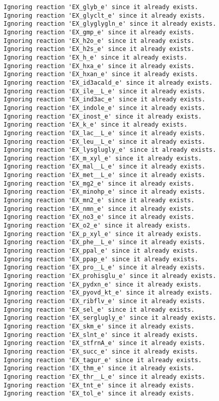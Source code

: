 \documentclass[
  letterpaper,
  DIV=11,
  numbers=noendperiod]{scrartcl}
\begin{document}
\begin{verbatim}
Ignoring reaction 'EX_glyb_e' since it already exists.
Ignoring reaction 'EX_glyclt_e' since it already exists.
Ignoring reaction 'EX_glyglygln_e' since it already exists.
Ignoring reaction 'EX_gmp_e' since it already exists.
Ignoring reaction 'EX_h2o_e' since it already exists.
Ignoring reaction 'EX_h2s_e' since it already exists.
Ignoring reaction 'EX_h_e' since it already exists.
Ignoring reaction 'EX_hxa_e' since it already exists.
Ignoring reaction 'EX_hxan_e' since it already exists.
Ignoring reaction 'EX_id3acald_e' since it already exists.
Ignoring reaction 'EX_ile__L_e' since it already exists.
Ignoring reaction 'EX_ind3ac_e' since it already exists.
Ignoring reaction 'EX_indole_e' since it already exists.
Ignoring reaction 'EX_inost_e' since it already exists.
Ignoring reaction 'EX_k_e' since it already exists.
Ignoring reaction 'EX_lac__L_e' since it already exists.
Ignoring reaction 'EX_leu__L_e' since it already exists.
Ignoring reaction 'EX_lysglugly_e' since it already exists.
Ignoring reaction 'EX_m_xyl_e' since it already exists.
Ignoring reaction 'EX_mal__L_e' since it already exists.
Ignoring reaction 'EX_met__L_e' since it already exists.
Ignoring reaction 'EX_mg2_e' since it already exists.
Ignoring reaction 'EX_minohp_e' since it already exists.
Ignoring reaction 'EX_mn2_e' since it already exists.
Ignoring reaction 'EX_nmn_e' since it already exists.
Ignoring reaction 'EX_no3_e' since it already exists.
Ignoring reaction 'EX_o2_e' since it already exists.
Ignoring reaction 'EX_p_xyl_e' since it already exists.
Ignoring reaction 'EX_phe__L_e' since it already exists.
Ignoring reaction 'EX_ppal_e' since it already exists.
Ignoring reaction 'EX_ppap_e' since it already exists.
Ignoring reaction 'EX_pro__L_e' since it already exists.
Ignoring reaction 'EX_prohisglu_e' since it already exists.
Ignoring reaction 'EX_pydxn_e' since it already exists.
Ignoring reaction 'EX_pyovd_kt_e' since it already exists.
Ignoring reaction 'EX_ribflv_e' since it already exists.
Ignoring reaction 'EX_sel_e' since it already exists.
Ignoring reaction 'EX_serglugly_e' since it already exists.
Ignoring reaction 'EX_skm_e' since it already exists.
Ignoring reaction 'EX_slnt_e' since it already exists.
Ignoring reaction 'EX_stfrnA_e' since it already exists.
Ignoring reaction 'EX_succ_e' since it already exists.
Ignoring reaction 'EX_tagur_e' since it already exists.
Ignoring reaction 'EX_thm_e' since it already exists.
Ignoring reaction 'EX_thr__L_e' since it already exists.
Ignoring reaction 'EX_tnt_e' since it already exists.
Ignoring reaction 'EX_tol_e' since it already exists.

\end{verbatim}
\end{document}
